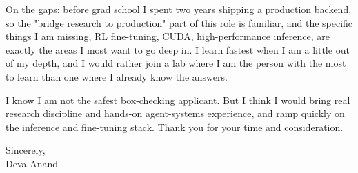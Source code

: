 \documentclass[letterpaper,11pt]{article}
\begin{document}
On the gaps: before grad school I spent two years shipping a production backend, so the "bridge research to production" part of this role is familiar, and the specific things I am missing, RL fine-tuning, CUDA, high-performance inference, are exactly the areas I most want to go deep in. I learn fastest when I am a little out of my depth, and I would rather join a lab where I am the person with the most to learn than one where I already know the answers.

I know I am not the safest box-checking applicant. But I think I would bring real research discipline and hands-on agent-systems experience, and ramp quickly on the inference and fine-tuning stack. Thank you for your time and consideration.

\vspace{2pt}

Sincerely, \\
Deva Anand
\end{document}
